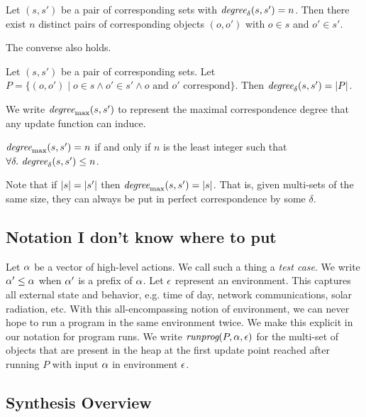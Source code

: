 \begin{thm}
\label{thm:sets-to-objects}
Let $(s,s')$ be a pair of corresponding sets with $\textit{degree}_{\delta}(s,s') = n$.
Then there exist $n$ distinct pairs of corresponding objects $(o,o')$
with $o \in s$ and $o' \in s'$.
\end{thm}

The converse also holds.

\begin{thm}
\label{thm:objects-to-sets}
Let $(s,s')$ be a pair of corresponding sets.  Let $P = \{(o,o') \mid
o \in s \wedge o' \in s' \wedge \text{$o$ and $o'$ correspond}\}$.
Then $\textit{degree}_{\delta}(s,s') = \lvert P \rvert$.
\end{thm}

We write $\textit{degree}_\textrm{max}(s,s')$ to represent the maximal correspondence
degree that any update function can induce.

\begin{defn}
$\textit{degree}_\textrm{max}(s,s') = n$ if and only if $n$ is the least integer such
  that $\forall \delta.\ \textit{degree}_{\delta}(s,s') \leq n$.
\end{defn}

Note that if $\lvert s \rvert = \lvert s' \rvert$ then $\textit{degree}_\textrm{max}(s,s') =
\lvert s \rvert$.  That is, given multi-sets of the same size, they can
always be put in perfect correspondence by some $\delta$.

\subsection{Notation I don't know where to put}

Let $\alpha$ be a vector of high-level actions.  We call such a thing
a \emph{test case}.  We write $\alpha' \leq \alpha$ when $\alpha'$
is a prefix of $\alpha$.  Let $\epsilon$ represent an environment.  This
captures all external state and behavior, e.g. time of day, network
communications, solar radiation, etc.  With this all-encompassing
notion of environment, we can never hope to run a program in the same
environment twice.  We make this explicit in our notation for program
runs.  We write $\textit{runprog}(P,\alpha,\epsilon)$ for the multi-set of
objects that are present in the heap at the first update point reached
after running $P$ with input $\alpha$ in environment $\epsilon$.

\subsection{Synthesis Overview}


